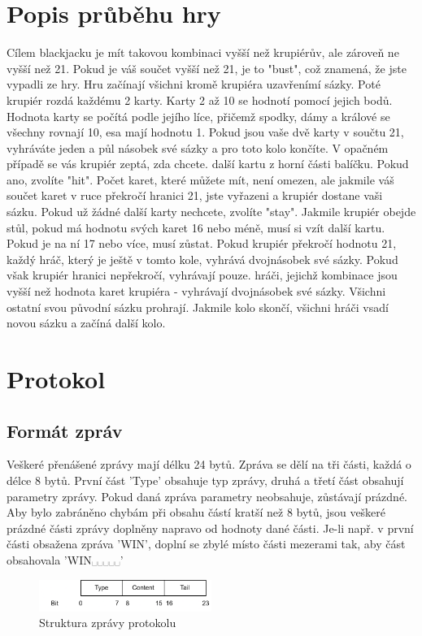 \documentclass[12pt]{article}
\begin{document}
\section{Popis průběhu hry}
Cílem blackjacku je mít takovou kombinaci vyšší než krupiérův, ale zároveň ne vyšší než 21. Pokud je váš součet vyšší než 21, je to "bust", což znamená, že jste vypadli ze hry.
Hru začínají všichni kromě krupiéra uzavřenímí sázky. Poté krupiér rozdá každému 2 karty.
Karty 2 až 10 se hodnotí pomocí jejich bodů.
Hodnota karty se počítá podle jejího líce, přičemž spodky, dámy a králové se všechny rovnají 10, esa mají hodnotu 1. Pokud jsou vaše dvě karty v součtu 21, vyhráváte jeden a půl násobek své sázky a pro toto kolo končíte.
V opačném případě se vás krupiér zeptá, zda chcete.
další kartu z horní části balíčku. Pokud ano, zvolíte "hit". Počet karet, které můžete mít, není omezen, ale jakmile váš součet karet v ruce překročí hranici 21, jste vyřazeni a krupiér dostane vaši sázku.
Pokud už žádné další karty nechcete, zvolíte "stay". Jakmile krupiér obejde stůl, pokud má hodnotu svých karet 16 nebo méně, musí si vzít další kartu. Pokud je na ní 17 nebo více, musí zůstat. Pokud krupiér překročí hodnotu 21, každý hráč, který je ještě v tomto kole, vyhrává dvojnásobek své sázky. Pokud však krupiér hranici nepřekročí, vyhrávají pouze.
hráči, jejichž kombinace jsou vyšší než hodnota karet krupiéra - vyhrávají dvojnásobek své sázky. Všichni ostatní svou původní sázku prohrají. Jakmile kolo skončí, všichni hráči
vsadí novou sázku a začíná další kolo.


\newpage
\section{Protokol}
\subsection{Formát zpráv}
Veškeré přenášené zprávy mají délku 24 bytů. Zpráva se dělí na tři části, každá o délce 8 bytů. První část 'Type' obsahuje typ zprávy, druhá a třetí část obsahují parametry zprávy. Pokud daná zpráva parametry neobsahuje, zůstávají prázdné. Aby bylo zabráněno chybám při obsahu částí kratší než 8 bytů, jsou veškeré prázdné části zprávy doplněny napravo od hodnoty dané části. Je-li např. v první části obsažena zpráva 'WIN', doplní se zbylé místo části mezerami tak, aby část obsahovala 'WIN␣␣␣␣␣'
\begin{figure}[htbp]
\centering
\includegraphics[width=0.5\textwidth]{protocol_structure.png}
\caption{Struktura zprávy protokolu}
\end{figure}
\end{document}
